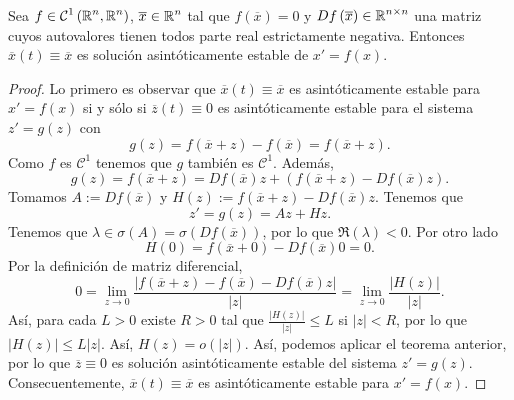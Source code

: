 \begin{colorary}
Sea $\displaystyle f \in \mathcal{C}^{1}\left(\mathbb{R}^{n}, \mathbb{R}^{n}\right) $, $\displaystyle \overline{x}\in \mathbb{R}^{n} $ tal que $\displaystyle f\left(\overline{x}\right)=0 $ y $\displaystyle Df\left(\overline{x}\right)\in \mathbb{R}^{n \times n} $ una matriz cuyos autovalores tienen todos parte real estrictamente negativa. 
Entonces $\displaystyle \overline{x}\left(t\right)\equiv \overline{x} $ es solución asintóticamente estable de $\displaystyle x'=f\left(x\right) $.
\end{colorary}
\begin{proof}
Lo primero es observar que $\displaystyle \overline{x}\left(t\right)\equiv \overline{x} $ es asintóticamente estable para $\displaystyle x' = f\left(x\right) $ si y sólo si $\displaystyle \overline{z}\left(t\right)\equiv 0 $ es asintóticamente estable para el sistema $\displaystyle z '=g\left(z\right) $ con 
\[g\left(z\right)=f\left(\overline{x}+z\right)-f\left(\overline{x}\right)=f\left(\overline{x}+z\right) .\]
Como $\displaystyle f $ es $\displaystyle \mathcal{C}^{1} $ tenemos que $\displaystyle g $ también es $\displaystyle \mathcal{C}^{1} $. Además, 
\[g\left(z\right)=f\left(\overline{x}+z\right)= Df\left(\overline{x}\right)z+\left(f\left(\overline{x}+z\right)-Df\left(\overline{x}\right)z\right).\]
Tomamos $\displaystyle A := Df\left(\overline{x}\right) $ y $\displaystyle H\left(z\right):= f\left(\overline{x}+z\right)-Df\left(\overline{x}\right)z$. Tenemos que 
\[z' = g\left(z\right)=Az + Hz .\]
Tenemos que $\displaystyle \lambda \in \sigma\left(A\right)=\sigma\left(Df\left(\overline{x}\right)\right) $, por lo que $\displaystyle \Re\left(\lambda \right)< 0 $. Por otro lado
\[H\left(0\right)=f\left(\overline{x}+0\right)-Df\left(\overline{x}\right)0=0 .\]
Por la definición de matriz diferencial,
\[0 = \lim_{z \to 0}\frac{ \left|f\left(\overline{x}+z\right)-f\left(\overline{x}\right)-Df\left(\overline{x}\right)z\right|}{ \left|z\right|}=\lim_{z \to 0}\frac{ \left|H\left(z\right)\right|}{ \left|z\right|} .\]
Así, para cada $\displaystyle L > 0 $ existe $\displaystyle R > 0 $ tal que $\displaystyle \frac{ \left|H\left(z\right)\right|}{ \left|z\right|} \leq L $ si $\displaystyle \left|z\right|<R $, por lo que $\displaystyle \left|H\left(z\right)\right|\leq L \left|z\right| $. Así, $\displaystyle H\left(z\right)=o\left( \left|z\right|\right) $. 
Así, podemos aplicar el teorema anterior, por lo que $\displaystyle \overline{z}\equiv 0 $ es solución asintóticamente estable del sistema $\displaystyle z' = g\left(z\right) $. Consecuentemente, $\displaystyle \overline{x}\left(t\right)\equiv \overline{x} $ es asintóticamente estable para $\displaystyle x '= f\left(x\right) $. 
\end{proof}
